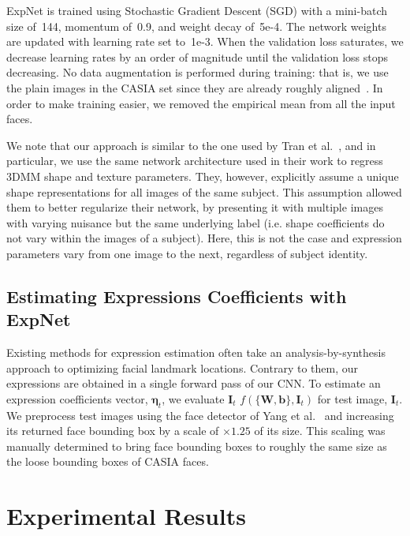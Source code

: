 \documentclass[a4paper, 10pt, conference]{ieeeconf}
\def\mbf#1{\mathbf{#1}}
\begin{document}
ExpNet is trained using Stochastic Gradient Descent (SGD) with a mini-batch size of~144, momentum of~0.9, and weight decay of~5e-4. The network weights are updated with learning rate set to~1e-3. When the validation loss saturates, we decrease learning rates by an order of magnitude until the validation loss stops decreasing. No data augmentation is performed during training: that is, we use the plain images in the CASIA set since they are already roughly aligned~\cite{yi2014learning}. In order to make training easier, we removed the empirical mean from all the input faces.

We note that our approach is similar to the one used by Tran et al.~\cite{tran16_3dmm_cnn}, and in particular, we use the same network architecture used in their work to regress 3DMM shape and texture parameters. They, however, explicitly assume a unique shape representations for all images of the same subject. This assumption allowed them to better regularize their network, by presenting it with multiple images with varying nuisance but the same underlying label (i.e. shape coefficients do not vary within the images of a subject). Here, this is not the case and expression parameters vary from one image to the next, regardless of subject identity.



\subsection{Estimating Expressions Coefficients with ExpNet}\label{sec:predict}
Existing methods for expression estimation often take an analysis-by-synthesis approach to optimizing facial landmark locations. Contrary to them, our expressions are obtained in a single forward pass of our CNN. To estimate an expression coefficients vector, $\boldsymbol{\eta}_t$, we evaluate $\mbf{I}_t$ $f(\{\mbf{W},\mbf{b}\}, \mbf{I}_t)$ for test image, $\mbf{I}_t$. We preprocess test images using the face detector of Yang et al.~\cite{yang2016multi} and increasing its returned face bounding box by a scale of $\times 1.25$ of its size. This scaling was manually determined to bring face bounding boxes to roughly the same size as the loose bounding boxes of CASIA faces.




\section{Experimental Results}\label{sec:expt}
\end{document}
